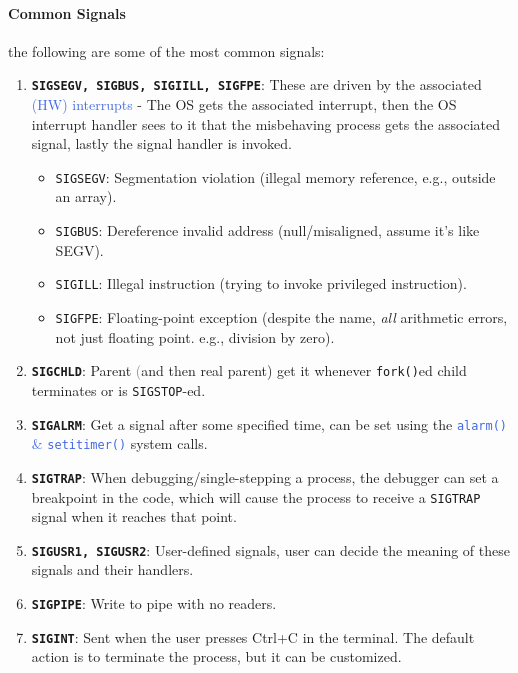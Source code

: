 \documentclass[openany,12pt]{book}
\newcommand{\code}[1]{\texttt{#1}}
\newcommand{\blue}[1]{\textcolor{RoyalBlue}{#1}}
\newcommand{\gray}[1]{\textcolor{gray}{#1}}
\begin{document}
\paragraph{Common Signals} the following are some of the most common signals:
\begin{enumerate}
  \item \textbf{\code{SIGSEGV, SIGBUS, SIGIILL, SIGFPE}}: These are driven by the associated \blue{(HW) interrupts} - The OS gets the associated interrupt, then the OS interrupt handler sees to it that the misbehaving process gets the associated signal, lastly the signal handler is invoked.
        \begin{itemize}
          \item \texttt{SIGSEGV}: Segmentation violation (illegal memory reference, e.g., outside an array).
          \item \texttt{SIGBUS}: Dereference invalid address (null/misaligned, assume it's like SEGV).
          \item \texttt{SIGILL}: Illegal instruction (trying to invoke privileged instruction).
          \item \texttt{SIGFPE}: Floating-point exception (despite the name, \textit{all} arithmetic errors, not just floating point. e.g., division by zero).
        \end{itemize}

  \item \textbf{\code{SIGCHLD}}: Parent \gray(and then real parent) get it whenever \code{fork()}ed child terminates or is \code{SIGSTOP}-ed.

  \item \textbf{\code{SIGALRM}}: Get a signal after some specified time, can be set using the \blue{\code{alarm()} \& \code{setitimer()}} system calls.

  \item \textbf{\code{SIGTRAP}}: When debugging/single-stepping a process, the debugger can set a breakpoint in the code, which will cause the process to receive a \texttt{SIGTRAP} signal when it reaches that point.

  \item \textbf{\code{SIGUSR1, SIGUSR2}}: User-defined signals, user can decide the meaning of these signals and their handlers.

  \item \textbf{\code{SIGPIPE}}: Write to pipe with no readers.

  \item \textbf{\code{SIGINT}}: Sent when the user presses Ctrl+C in the terminal. The default action is to terminate the process, but it can be customized.


\end{enumerate}
\end{document}
